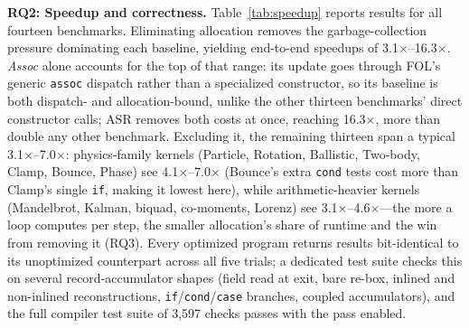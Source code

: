 \documentclass[sigplan,screen,review,anonymous]{acmart}
\begin{document}
\textbf{RQ2: Speedup and correctness.} Table~\ref{tab:speedup} reports
results for all fourteen benchmarks. Eliminating allocation removes the
garbage-collection pressure dominating each baseline, yielding end-to-end
speedups of 3.1$\times$--16.3$\times$. \emph{Assoc} alone accounts for the
top of that range: its update goes through FOL's generic \texttt{assoc}
dispatch rather than a specialized constructor, so its baseline is
both dispatch- and allocation-bound, unlike the other thirteen
benchmarks' direct constructor calls; ASR removes both costs at
once, reaching 16.3$\times$, more than double any other benchmark.
Excluding it, the remaining thirteen span a typical
3.1$\times$--7.0$\times$: physics-family kernels (Particle, Rotation,
Ballistic, Two-body, Clamp, Bounce, Phase) see 4.1$\times$--7.0$\times$
(Bounce's extra \texttt{cond} tests cost more than Clamp's single
\texttt{if}, making it lowest here), while arithmetic-heavier
kernels (Mandelbrot, Kalman, biquad, co-moments, Lorenz) see
3.1$\times$--4.6$\times$---the more a loop computes per step, the smaller
allocation's share of runtime and the win from removing it
(RQ3). Every optimized program returns results bit-identical to its
unoptimized counterpart across all five trials; a dedicated test suite
checks this on several record-accumulator shapes (field read at exit,
bare re-box, inlined and non-inlined reconstructions,
\texttt{if}/\texttt{cond}/\texttt{case} branches, coupled accumulators),
and the full compiler test
suite of 3{,}597 checks passes with the pass enabled.
\end{document}
